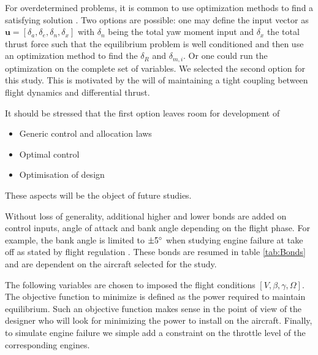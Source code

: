 For overdetermined problems, it is common to use optimization methods to find a satisfying solution \cite{OppeinheimerControlAllocation}. Two options are possible: one may define the input vector as $\mathbf{u}=[\delta_a,\delta_e,\delta_n, \delta_x]$ with $\delta_n$ being the total yaw moment input and $\delta_x$ the total thrust force such that the equilibrium problem is well conditioned and then use an optimization method to find the $\delta_R$ and $\delta_{m,i}$. Or one could run the optimization on the complete set of variables. We selected the second option for this study. This is motivated by the will of maintaining a tight coupling between flight dynamics and differential thrust.

It should be stressed that the first option leaves room for development of 
\begin{itemize}
	\item Generic control and allocation laws
	\item Optimal control
	\item Optimisation of design
\end{itemize}

These aspects will be the object of future studies.

Without loss of generality, additional higher and lower bonds are added on control inputs, angle of attack and bank angle depending on the flight phase. For example, the bank angle is limited to $\pm5\degree$ when studying engine failure at take off as stated by flight regulation \cite{CS25}. These bonds are resumed in table \ref{tab:Bonds} and are dependent on the aircraft selected for the study.

The following variables are chosen to imposed the flight conditions $[V,\beta,\gamma,\Omega]$. The objective function to minimize is defined as the power required to maintain equilibrium. Such an objective function makes sense in the point of view of the designer who will look for minimizing the power to install on the aircraft. Finally, to simulate engine failure we simple add a constraint on the throttle level of the corresponding engines.

